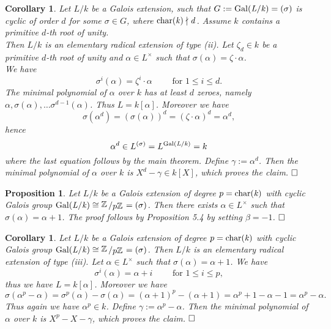 \documentclass[11pt]{book}
\newtheorem{proposition}[theorem]{Proposition}
\newtheorem{corollary}[theorem]{Corollary}
\theoremstyle{nonumberbreak}
\newenvironment{pr}[1][]{\ifthenelse{\equal{#1}{}}{\proof}{\proof[#1]}\rm}{\endproof}
\newcommand{\slant}[2]{{\raisebox{.1em}{$#1$}\left/\raisebox{-.1em}{$#2$}\right.}}
\begin{document}
\begin{spacing}{1.3}
\begin{corollary} %
Let $L/k$ be a Galois extension, such that $G:=\rm{Gal}\it(L/k)=( \sigma )$ is cyclic of order $d$ for some $\sigma \in G$, where $\rm{char}\it(k) \nmid d$. Assume $k$ contains a primitive $d$-th root of unity.\\ Then $L/k$ is an elementary radical extension of type (ii).
\begin{pr}
Let $\zeta_d\in k$ be a primitive $d$-th root of unity and $\alpha \in L^{\times}$ such that $\sigma(\alpha)=\zeta \cdot \alpha$.\\
We have $$\sigma^{i}(\alpha)=\zeta^{i} \cdot \alpha \qquad \textrm{ for }1 \leqslant i \leqslant d.$$ The minimal polynomial of $\alpha$ over $k$ has at least $d$ zeroes, namely $\alpha, \sigma(\alpha), \dots \sigma^{d-1}(\alpha)$. Thus $L=k[\alpha]$.
Moreover we have $$\sigma(\alpha^d)=\left(\sigma(\alpha)\right)^d=\left(\zeta \cdot \alpha \right)^d=\alpha^d,$$hence $$\alpha^d \in L^{( \sigma )}=L^{\rm{Gal}\it(L/k)}=k$$
where the last equation follows by the main theorem.
Define $\gamma:=\alpha^d$. Then the minimal polynomial of  $\alpha$ over $k$ is $X^d-\gamma \in k[X]$, which proves the claim. $\hfill \Box$
\end{pr}
\end{corollary}

\begin{proposition} %
Let $L/k$ be a Galois extension of degree $p=\rm{char}\it(k)$ with cyclic Galois group $\gal(L/k) \cong \slant{\mathbb{Z}}{p \mathbb{Z}} = ( \sigma )$.
Then there exists $\alpha \in L^{\times}$ such that $\sigma(\alpha)=\alpha+1$.
\begin{pr}
The proof follows by Proposition 5.4 by setting $\beta=-1$.  $\hfill \Box$
\end{pr}
\end{proposition}

\begin{corollary} %
Let $L/k$ be a Galois extension of degree $p=\rm{char}\it(k)$ with cyclic Galois group $\gal(L/k) \cong \slant{\mathbb{Z}}{p \mathbb{Z}}=( \sigma )$. Then $L/k$ is an elementary radical extension of type (iii).
\begin{pr}
Let $\alpha \in L^{\times}$ such that $\sigma(\alpha)=\alpha+1$.
We have $$\sigma^{i}(\alpha)=\alpha+i \qquad \textrm{ for }1 \leqslant i \leqslant p,$$ thus we have $L=k[\alpha]$.
Moreover we have
$$\sigma(\alpha^p-\alpha)=\sigma^p(\alpha)-\sigma(\alpha)=\left(\alpha+1\right)^p-(\alpha+1)=\alpha^p+1-\alpha-1=\alpha^p-\alpha.$$
Thus again we have $\alpha^p \in k$. Define $\gamma:= \alpha^p-\alpha$. Then the minimal polynomial of $\alpha$ over $k$ is $X^p-X-\gamma$, which proves the claim. $\hfill \Box$
\end{pr}
\end{corollary}


\end{spacing}
\end{document}
